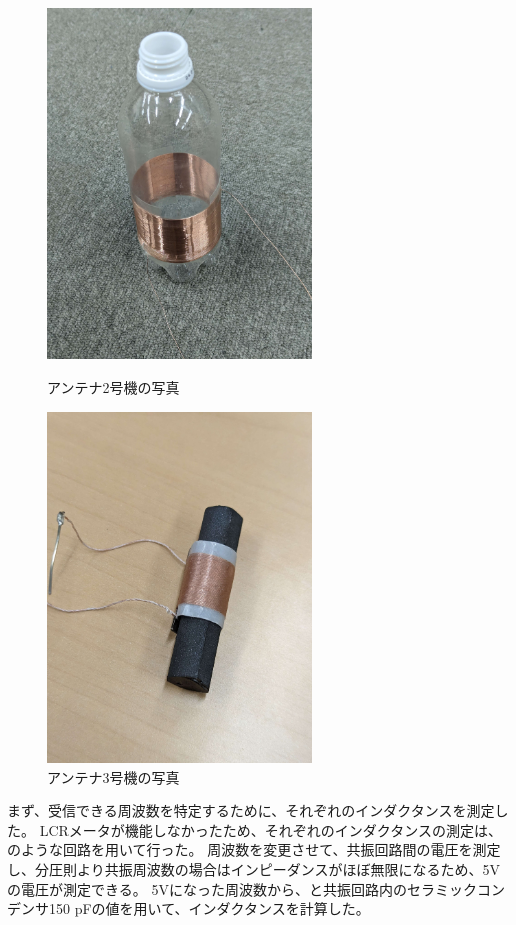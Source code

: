 \documentclass[report.tex]{subfiles}
\begin{document}
\begin{figure}[H]
	\begin{minipage}[b]{0.5\linewidth}
		\centering
		\includegraphics[width=7cm]{fig/2.jpg}
		\caption{アンテナ2号機の写真}
		\label{fig:2}
	\end{minipage}
	\begin{minipage}[b]{0.5\linewidth}
		\centering
		\includegraphics[width=7cm]{fig/3.jpg}
		\caption{アンテナ3号機の写真}
		\label{fig:3}
	\end{minipage}
\end{figure}

まず、受信できる周波数を特定するために、それぞれのインダクタンスを測定した。
LCRメータが機能しなかったため、それぞれのインダクタンスの測定は、のような回路を用いて行った。
周波数を変更させて、共振回路間の電圧を測定し、分圧則より共振周波数の場合はインピーダンスがほぼ無限になるため、5Vの電圧が測定できる。
5Vになった周波数から、と共振回路内のセラミックコンデンサ150 pFの値を用いて、インダクタンスを計算した。
\end{document}
